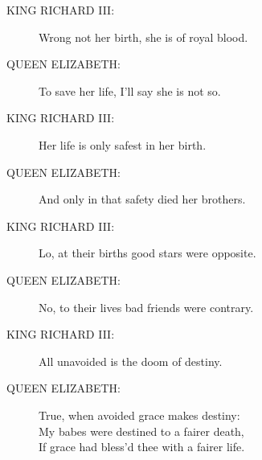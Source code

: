 \documentclass{article}
\begin{document}
\begin{description}
\item[KING RICHARD III:] 
\hspace{1pt}Wrong not her birth, she is of royal blood.\\
\end{description}
\begin{description}
\item[QUEEN ELIZABETH:] 
\hspace{1pt}To save her life, I'll say she is not so.\\
\end{description}
\begin{description}
\item[KING RICHARD III:] 
\hspace{1pt}Her life is only safest in her birth.\\
\end{description}
\begin{description}
\item[QUEEN ELIZABETH:] 
\hspace{1pt}And only in that safety died her brothers.\\
\end{description}
\begin{description}
\item[KING RICHARD III:] 
\hspace{1pt}Lo, at their births good stars were opposite.\\
\end{description}
\begin{description}
\item[QUEEN ELIZABETH:] 
\hspace{1pt}No, to their lives bad friends were contrary.\\
\end{description}
\begin{description}
\item[KING RICHARD III:] 
\hspace{1pt}All unavoided is the doom of destiny.\\
\end{description}
\begin{description}
\item[QUEEN ELIZABETH:] 
\hspace{1pt}True, when avoided grace makes destiny:\\
\hspace{1pt}My babes were destined to a fairer death,\\
\hspace{1pt}If grace had bless'd thee with a fairer life.\\
\end{description}
\end{document}
